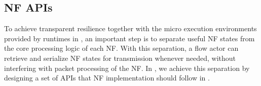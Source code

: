 

\subsection{NF APIs}
\label{sec:NFAPIs}

To achieve transparent resilience together with the micro execution environments provided by runtimes in \nfactor, an important step is to separate useful NF states from the core processing logic of each NF. With this separation, a flow actor can retrieve and serialize NF states for transmission whenever needed, without interfering with packet processing of the NF. In \nfactor, we achieve this separation by designing a set of APIs that NF implementation should follow in \nfactor.

